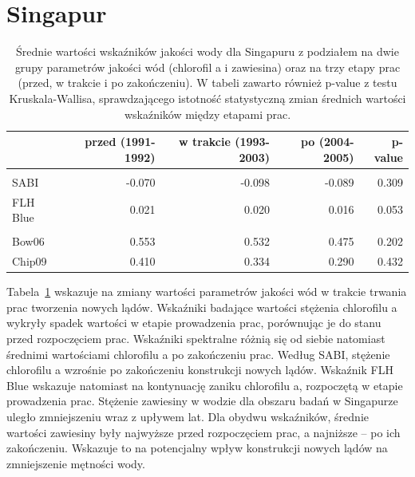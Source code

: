 \documentclass{amuthesis}
\begin{document}
\hypertarget{singapur-1}{%
\section{Singapur}\label{singapur-1}}

\hypertarget{tbl-sg_stats}{}
\begin{table}
\caption{\label{tbl-sg_stats}Średnie wartości wskaźników jakości wody dla Singapuru z podziałem na
dwie grupy parametrów jakości wód (chlorofil a i zawiesina) oraz na trzy
etapy prac (przed, w trakcie i po zakończeniu). W tabeli zawarto również
p-value z testu Kruskala-Wallisa, sprawdzającego istotność statystyczną
zmian średnich wartości wskaźników między etapami prac. }\tabularnewline

\centering
\begin{tabular}{lrrrr}
\toprule
  & przed (1991-1992) & w trakcie (1993-2003) & po (2004-2005) & p-value\\
\midrule
\addlinespace[0.3em]
\multicolumn{5}{l}{\textbf{chlorofil a}}\\
\hspace{1em}SABI & -0.070 & -0.098 & -0.089 & 0.309\\
\hspace{1em}FLH Blue & 0.021 & 0.020 & 0.016 & 0.053\\
\addlinespace[0.3em]
\multicolumn{5}{l}{\textbf{zawiesina}}\\
\hspace{1em}Bow06 & 0.553 & 0.532 & 0.475 & 0.202\\
\hspace{1em}Chip09 & 0.410 & 0.334 & 0.290 & 0.432\\
\bottomrule
\end{tabular}
\end{table}

Tabela~\ref{tbl-sg_stats} wskazuje na zmiany wartości parametrów jakości
wód w trakcie trwania prac tworzenia nowych lądów. Wskaźniki badające
wartości stężenia chlorofilu a wykryły spadek wartości w etapie
prowadzenia prac, porównując je do stanu przed rozpoczęciem prac.
Wskaźniki spektralne różnią się od siebie natomiast średnimi wartościami
chlorofilu a po zakończeniu prac. Według SABI, stężenie chlorofilu a
wzrośnie po zakończeniu konstrukcji nowych lądów. Wskaźnik FLH Blue
wskazuje natomiast na kontynuację zaniku chlorofilu a, rozpoczętą w
etapie prowadzenia prac. Stężenie zawiesiny w wodzie dla obszaru badań w
Singapurze uległo zmniejszeniu wraz z upływem lat. Dla obydwu
wskaźników, średnie wartości zawiesiny były najwyższe przed rozpoczęciem
prac, a najniższe -- po ich zakończeniu. Wskazuje to na potencjalny
wpływ konstrukcji nowych lądów na zmniejszenie mętności wody.
\end{document}
